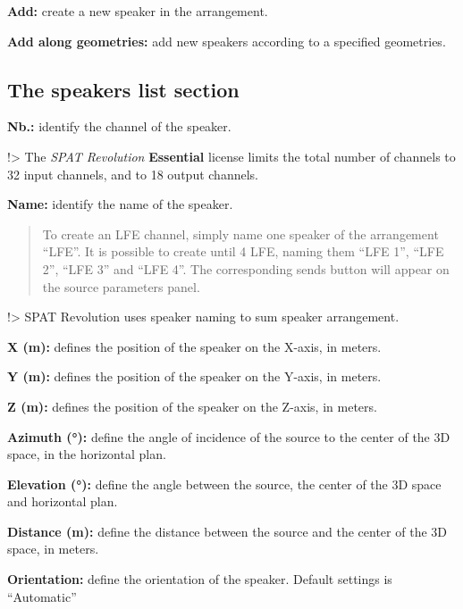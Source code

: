\documentclass[
  letterpaper,
  DIV=11,
  numbers=noendperiod]{scrreport}
\begin{document}
\textbf{Add:} create a new speaker in the arrangement.

\textbf{Add along geometries:} add new speakers according to a specified
geometries.

\hypertarget{the-speakers-list-section}{%
\subsection{The speakers list section}\label{the-speakers-list-section}}

\textbf{Nb.:} identify the channel of the speaker.

!\textgreater{} The \emph{SPAT Revolution} \textbf{Essential} license
limits the total number of channels to 32 input channels, and to 18
output channels.

\textbf{Name:} identify the name of the speaker.

\begin{quote}
To create an LFE channel, simply name one speaker of the arrangement
``LFE''. It is possible to create until 4 LFE, naming them ``LFE 1'',
``LFE 2'', ``LFE 3'' and ``LFE 4''. The corresponding sends button will
appear on the source parameters panel.
\end{quote}

!\textgreater{} SPAT Revolution uses speaker naming to sum speaker
arrangement.

\textbf{X (m):} defines the position of the speaker on the X-axis, in
meters.

\textbf{Y (m):} defines the position of the speaker on the Y-axis, in
meters.

\textbf{Z (m):} defines the position of the speaker on the Z-axis, in
meters.

\textbf{Azimuth (°):} define the angle of incidence of the source to the
center of the 3D space, in the horizontal plan.

\textbf{Elevation (°):} define the angle between the source, the center
of the 3D space and horizontal plan.

\textbf{Distance (m):} define the distance between the source and the
center of the 3D space, in meters.

\textbf{Orientation:} define the orientation of the speaker. Default
settings is ``Automatic''
\end{document}
